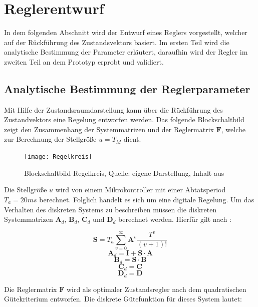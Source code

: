 \section{Reglerentwurf}
In dem folgenden Abschnitt wird der Entwurf eines Reglers vorgestellt, welcher auf der Rückführung des Zustandsvektors basiert. Im ersten Teil wird die analytische Bestimmung der Parameter erläutert, daraufhin wird der Regler im zweiten Teil an dem Prototyp erprobt und validiert.

\subsection{Analytische Bestimmung der Reglerparameter}
Mit Hilfe der Zustandsraumdarstellung kann über die Rückführung des Zustandvektors eine Regelung entworfen werden. Das folgende Blockschaltbild zeigt den Zusammenhang der Systemmatrizen und der Reglermatrix $\textbf{F}$, welche zur Berechnung der Stellgröße $u=T_M$ dient.

\begin{figure}[h]
\label{Regelkreis_pic}
\texttt{[image: Regelkreis]}
\caption{Blockschaltbild Regelkreis, Quelle: eigene Darstellung, Inhalt aus \cite{RT2}}
\end{figure}

Die Stellgröße $u$ wird von einem Mikrokontroller mit einer Abtatsperiod $T_a = 20ms$ berechnet. Folglich handelt es sich um eine digitale Regelung. Um das Verhalten des diskreten Systems zu beschreiben müssen die diskreten Systemmatrizen $\textbf{A}_d$, $\textbf{B}_d$, $\textbf{C}_d$ und $\textbf{D}_d$ berechnet werden. Hierfür gilt nach \cite{RT2}:

\begin{equation}
\textbf{S} = T_a \sum_{v=0}^{\infty} \textbf{A}^v \frac{T^v}{(v+1)!}
\end{equation}
\begin{equation}
\textbf{A}_d = \textbf{I} + \textbf{S} \cdot \textbf{A}
\end{equation}
\begin{equation}
\textbf{B}_d = \textbf{S} \cdot \textbf{B}
\end{equation}
\begin{equation}
\textbf{C}_d = \textbf{C}
\end{equation}
\begin{equation}
\textbf{D}_d = \textbf{D}
\end{equation}

Die Reglermatrix $\textbf{F}$ wird als optimaler Zustandsregler nach dem quadratischen Gütekriterium entworfen. Die diskrete Gütefunktion für dieses System lautet:

